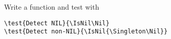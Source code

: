 \item Write a function  and test with
\begin{verbatim}
\test{Detect NIL}{\IsNil\Nil}
\test{Detect non-NIL}{\IsNil{\Singleton\Nil}}
\end{verbatim}
